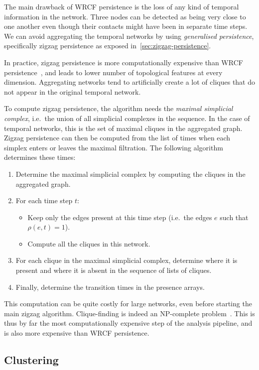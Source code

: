 \documentclass[a4paper,11pt,openany,extrafontsizes]{memoir}
\begin{document}
The main drawback of WRCF persistence is the loss of any kind of
temporal information in the network. Three nodes can be detected as
being very close to one another even though their contacts might have
been in separate time steps. We can avoid aggregating the temporal
networks by using \emph{generalised persistence}, specifically zigzag
persistence as exposed in~\autoref{sec:zigzag-persistence}.

In practice, zigzag persistence is more computationally expensive than
WRCF persistence~\cite{carlsson_zigzag_2009}, and leads to lower
number of topological features at every dimension. Aggregating
networks tend to artificially create a lot of cliques that do not
appear in the original temporal network.

To compute zigzag persistence, the algorithm needs the \emph{maximal
  simplicial complex}, i.e.\ the union of all simplicial complexes in
the sequence. In the case of temporal networks, this is the set of
maximal cliques in the aggregated graph. Zigzag persistence can then
be computed from the list of times when each simplex enters or leaves
the maximal filtration. The following algorithm determines these
times:
\begin{enumerate}
\item Determine the maximal simplicial complex by computing the
  cliques in the aggregated graph.
\item For each time step $t$:
  \begin{itemize}
  \item Keep only the edges present at this time step (i.e.\ the edges
    $e$ such that $\rho(e, t) = 1$).
  \item Compute all the cliques in this network.
  \end{itemize}
\item For each clique in the maximal simplicial complex, determine
  where it is present and where it is absent in the sequence of lists
  of cliques.
\item Finally, determine the transition times in the presence arrays.
\end{enumerate}

This computation can be quite costly for large networks, even before
starting the main zigzag algorithm. Clique-finding is indeed an
NP-complete problem~\cite{karp_reducibility_2010}. This is thus by far
the most computationally expensive step of the analysis pipeline, and
is also more expensive than WRCF persistence.

\subsection{Clustering}%
\label{sec:clustering}
\end{document}
